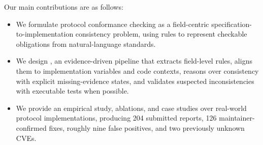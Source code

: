 Our main contributions are as follows:

\begin{itemize}[leftmargin=*]
  \item We formulate protocol conformance checking as a field-centric
  specification-to-implementation consistency problem, using  rules
  to represent checkable obligations from natural-language standards.

  \item We design \tool, an evidence-driven pipeline that extracts field-level
  rules, aligns them to implementation variables and code contexts, reasons
  over consistency with explicit missing-evidence states, and validates
  suspected inconsistencies with executable tests when possible.

  \item We provide an empirical study, ablations, and case studies over
  real-world protocol implementations, producing 204 submitted reports, 126
  maintainer-confirmed fixes, roughly nine false positives, and two previously
  unknown CVEs.
\end{itemize}
